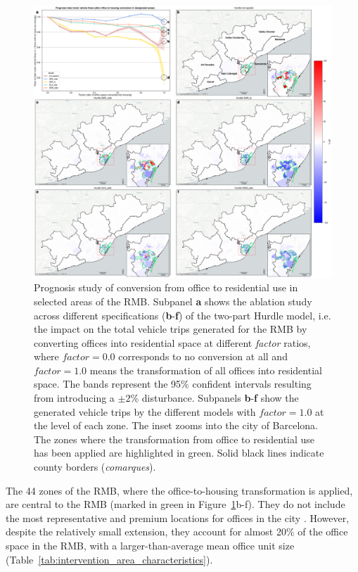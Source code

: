 \begin{figure}[h!]
    \centering
    \includegraphics[width=1\textwidth]{fig_prognosis_combined_v1 copy.png}
    \caption{Prognosis study of conversion from office to residential use in selected areas of the RMB. Subpanel \textbf{a} shows the ablation study across different specifications (\textbf{b}-\textbf{f}) of the two-part Hurdle model, i.e. the impact on the total vehicle trips generated for the RMB by converting offices into residential space at different \emph{factor} ratios, where $\mathit{factor}=0.0$ corresponds to no conversion at all and $\mathit{factor}=1.0$ means the transformation of all offices into residential space. The bands represent the 95\% confident intervals resulting from introducing a $\pm2\%$ disturbance. Subpanels \textbf{b}-\textbf{f} show the generated vehicle trips by the different models with $\mathit{factor}=1.0$ at the level of each zone. The inset zooms into the city of Barcelona. The zones where the transformation from office to residential use has been applied are highlighted in green. Solid black lines indicate county borders (\textit{comarques}).}
    \label{fig:prognosis_summary}
\end{figure}

The 44 zones of the RMB, where the office-to-housing transformation is applied, are central to the RMB (marked in green in Figure~\ref{fig:prognosis_summary}b-f). They do not include the most representative and premium locations for offices in the city \citep{EYStrategyandTransactions2023The2023}. However, despite the relatively small extension, they account for almost 20\% of the office space in the RMB, with a larger-than-average mean office unit size (Table~\ref{tab:intervention_area_characteristics}).

